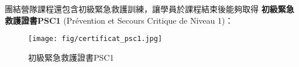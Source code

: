 \documentclass[a4paper,14pt]{extarticle}
\theoremstyle{plain}
\theoremstyle{remark}
\numberwithin{equation}{section}
\begin{document}
\begin{enumerate}
%
\end{enumerate}

\par 
團結營隊課程還包含初級緊急救護訓練，讓學員於課程結束後能夠取得
\textbf{初級緊急救護證書PSC1} (Prévention et Secours Critique de Niveau 1)：


\begin{figure}[H]
  \begin{center}
    \texttt{[image: fig/certificat\_psc1.jpg]}
  \end{center}
  \caption{初級緊急救護證書PSC1}
  \label{fig:certificat_psc1}
\end{figure}
\end{document}
